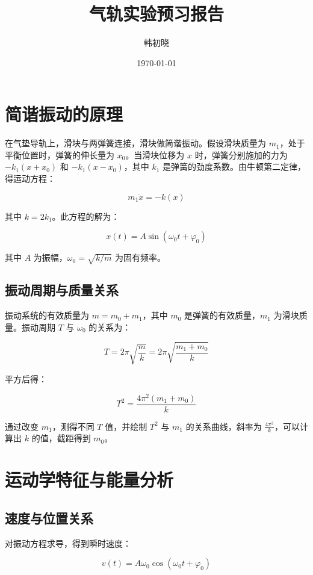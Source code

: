 \documentclass[a4paper,10pt]{article}
\begin{document}
\title{气轨实验预习报告} %
\author{韩初晓} %
\date{\today} %
\maketitle %

\newpage


\section{简谐振动的原理}

在气垫导轨上，滑块与两弹簧连接，滑块做简谐振动。假设滑块质量为 $m_1$，处于平衡位置时，弹簧的伸长量为 $x_0$。当滑块位移为 $x$ 时，弹簧分别施加的力为 $-k_1(x + x_0)$ 和 $-k_1(x - x_0)$，其中 $k_1$ 是弹簧的劲度系数。由牛顿第二定律，得运动方程：

\[
m_1 \ddot{x} = -k(x)
\]

其中 $k = 2k_1$。此方程的解为：

\[
x(t) = A \sin(\omega_0 t + \varphi_0)
\]

其中 $A$ 为振幅，$\omega_0 = \sqrt{k/m}$ 为固有频率。

\subsection{振动周期与质量关系}

振动系统的有效质量为 $m = m_0 + m_1$，其中 $m_0$ 是弹簧的有效质量，$m_1$ 为滑块质量。振动周期 $T$ 与 $\omega_0$ 的关系为：

\[
T = 2\pi \sqrt{\frac{m}{k}} = 2\pi \sqrt{\frac{m_1 + m_0}{k}}
\]

平方后得：

\[
T^2 = \frac{4\pi^2 (m_1 + m_0)}{k}
\]

通过改变 $m_1$，测得不同 $T$ 值，并绘制 $T^2$ 与 $m_1$ 的关系曲线，斜率为 $\frac{4\pi^2}{k}$，可以计算出 $k$ 的值，截距得到 $m_0$。

\section{运动学特征与能量分析}

\subsection{速度与位置关系}

对振动方程求导，得到瞬时速度：

\[
v(t) = A \omega_0 \cos(\omega_0 t + \varphi_0)
\]
\end{document}
